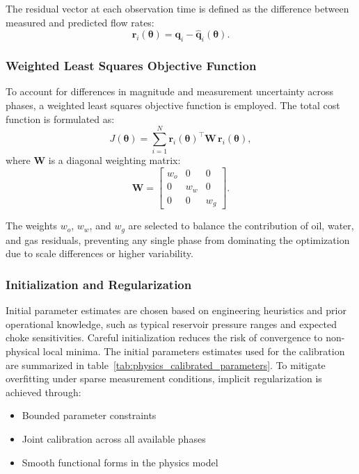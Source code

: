 \documentclass[12pt,APA]{uomthesis}
\begin{document}
The residual vector at each observation time is defined as the difference between measured and predicted flow rates:
\begin{equation}
\mathbf{r}_i(\boldsymbol{\theta}) = \mathbf{q}_i - \hat{\mathbf{q}}_i(\boldsymbol{\theta}).
\end{equation}

\subsubsection{Weighted Least Squares Objective Function}

To account for differences in magnitude and measurement uncertainty across phases, a weighted least squares objective function is employed. The total cost function is formulated as:
\begin{equation}
J(\boldsymbol{\theta}) = \sum_{i=1}^{N} \mathbf{r}_i(\boldsymbol{\theta})^\top \mathbf{W} \, \mathbf{r}_i(\boldsymbol{\theta}),
\end{equation}
where $\mathbf{W}$ is a diagonal weighting matrix:
\begin{equation}
\mathbf{W} =
\begin{bmatrix}
w_o & 0 & 0 \\
0 & w_w & 0 \\
0 & 0 & w_g
\end{bmatrix}.
\end{equation}

The weights $w_o$, $w_w$, and $w_g$ are selected to balance the contribution of oil, water, and gas residuals, preventing any single phase from dominating the optimization due to scale differences or higher variability.

\subsubsection{Initialization and Regularization}
Initial parameter estimates are chosen based on engineering heuristics and prior operational knowledge, such as typical reservoir pressure ranges and expected choke sensitivities. Careful initialization reduces the risk of convergence to non-physical local minima.
The initial parameters estimates used for the calibration are summarized in table~\ref{tab:physics_calibrated_parameters}.
To mitigate overfitting under sparse measurement conditions, implicit regularization is achieved through:

\begin{itemize}
    \item Bounded parameter constraints
    \item Joint calibration across all available phases
    \item Smooth functional forms in the physics model
\end{itemize}
\end{document}
